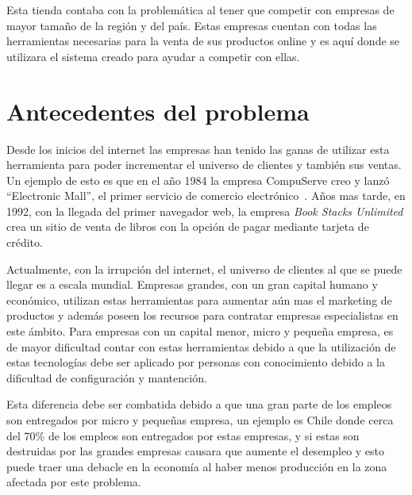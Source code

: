 Esta tienda contaba con la problemática al tener que competir con empresas de mayor 
tamaño de la región y del país. Estas empresas cuentan con todas las herramientas
necesarias para la venta de sus productos online y es aquí donde se utilizara 
el sistema creado para ayudar a competir con ellas. 


\section{Antecedentes del problema}

Desde los inicios del internet las empresas han tenido las ganas de utilizar
esta herramienta para poder incrementar el universo de clientes y también sus
ventas.
Un ejemplo de esto es que en el año 1984 la empresa CompuServe creo y lanzó
``Electronic Mall'', el primer servicio de comercio electrónico~\cite{Def:1}.
Años mas tarde, en 1992, con la llegada del primer navegador web, la empresa
\emph{Book Stacks Unlimited} crea un sitio de venta de libros con la opción de
pagar mediante tarjeta de crédito.

Actualmente, con la irrupción del internet, el universo de clientes al que se
puede llegar es a escala mundial.
Empresas grandes, con un gran capital humano y económico, utilizan estas
herramientas para aumentar aún mas el marketing de productos y además poseen los
recursos para contratar empresas especialistas en este ámbito.
Para empresas con un capital menor, micro y pequeña empresa, es de mayor
dificultad contar con estas herramientas debido a que la utilización de estas
tecnologías debe ser aplicado por personas con conocimiento debido a la dificultad
de configuración y mantención.

Esta diferencia debe ser combatida debido a que una gran parte de los empleos
son entregados por micro y pequeñas empresa, un ejemplo es Chile donde cerca del
70\% de los empleos son entregados por estas empresas, y si estas son destruidas
por las grandes empresas causara que aumente el desempleo y esto puede traer una
debacle en la economía al haber menos producción en la zona afectada por este
problema.
